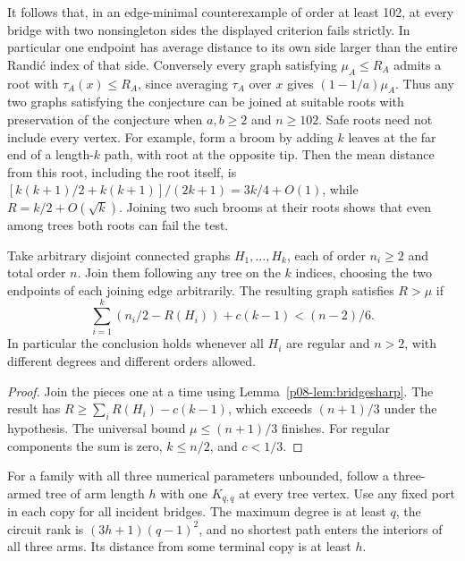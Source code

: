 \documentclass[11pt,a4paper]{article}
\begin{document}
It follows that, in an edge-minimal counterexample of order at least
102, at every bridge with two nonsingleton sides the displayed
criterion fails strictly. In particular one endpoint has average
distance to its own side larger than the entire Randi\'c index of that
side. Conversely every graph satisfying $\mu_A\le R_A$ admits a root
with $\tau_A(x)\le R_A$, since averaging $\tau_A$ over $x$ gives
$(1-1/a)\mu_A$. Thus any two graphs satisfying the conjecture can
be joined at suitable roots with preservation of the conjecture
when $a,b\ge2$ and $n\ge102$. Safe roots need not include every vertex.
For example, form a broom by adding $k$ leaves at the far end of a
length-$k$ path, with root at the opposite tip. Then the mean distance
from this root, including the root itself, is
$[k(k+1)/2+k(k+1)]/(2k+1)=3k/4+O(1)$,
while $R=k/2+O(\sqrt{k})$. Joining two such brooms at their roots
shows that even among trees both roots can fail the test.

\begin{corollary}\label{p08-cor:treeofregular}
Take arbitrary disjoint connected graphs $H_1,\ldots,H_k$, each
of order $n_i\ge2$ and total order $n$. Join them following any tree on
the $k$ indices, choosing the two endpoints of each joining edge
arbitrarily. The resulting graph satisfies $R>\mu$ if
\[
 \sum_{i=1}^k (n_i/2-R(H_i)) + c(k-1)<(n-2)/6 .
\]
In particular the conclusion holds whenever all $H_i$ are regular
and $n>2$, with different degrees and different orders allowed.
\end{corollary}
\begin{proof}
Join the pieces one at a time using Lemma~\ref{p08-lem:bridgesharp}. The
result has $R\ge\sum_i R(H_i)-c(k-1)$, which exceeds $(n+1)/3$
under the hypothesis. The universal bound $\mu\le(n+1)/3$ finishes.
For regular components the sum is zero, $k\le n/2$, and $c<1/3$.
\end{proof}
For a family with all three numerical parameters unbounded, follow a
three-armed tree of arm length $h$ with one $K_{q,q}$ at every tree
vertex. Use any fixed port in each copy for all incident bridges.
The maximum degree is at least $q$, the circuit rank is
$(3h+1)(q-1)^2$, and no shortest path enters the interiors of all
three arms. Its distance from some terminal copy is at least $h$.
\end{document}
